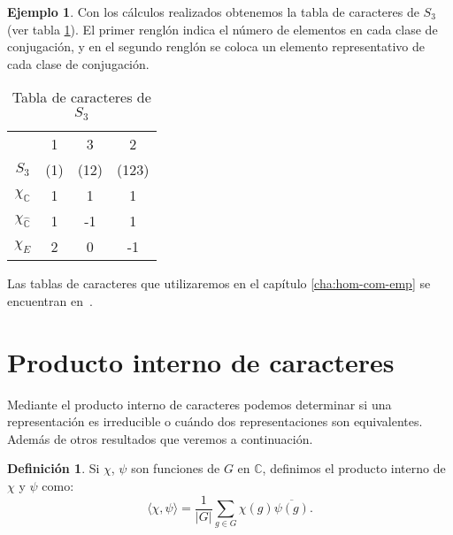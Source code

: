 \documentclass[12pt]{book}
\theoremstyle{definition}
\newtheorem{definition}[theorem]{Definición}
\newtheorem{example}[theorem]{Ejemplo}
\newcounter{in}
\newcounter{ini}
\begin{document}
\begin{example}
Con los cálculos realizados obtenemos la tabla de caracteres de
$S_{3}$ (ver tabla \ref{tabla-car-S3}). El primer renglón indica el
número de elementos en cada clase de conjugación, y en el segundo
renglón se coloca un elemento representativo de cada clase de
conjugación.
\begin{table}[htpb]
  \centering
  \begin{tabular}{ c| c c c}
      & 1 & 3 & 2 \\
      $S_{3}$ & (1) & (12) & (123) \\
      \hline
      $\chi_{\mathbb{C}}$ & 1 & 1 & 1 \\
      $\chi_{\mathbb{\hat C}}$ & 1 & -1 & 1 \\
      $\chi_{E}$ & 2 & 0 & -1 
    \end{tabular}
    
  \caption{Tabla de caracteres de $S_{3}$}
  \label{tabla-car-S3}
\end{table}

Las tablas de caracteres que utilizaremos en el capítulo
\ref{cha:hom-com-emp} se encuentran en~\cite{liebeck}.
\end{example}

\section{Producto interno de caracteres}
\label{producto-interno}

Mediante el producto interno de caracteres  podemos determinar si una
representación es irreducible o cuándo dos representaciones son
equivalentes. Además de otros resultados que veremos a continuación.
\begin{definition}
  Si $\chi$, $\psi$ son funciones de $G$ en $\mathbb{C}$, definimos el
  producto interno de $\chi$ y $\psi$ como:
  \begin{equation*}
    \langle\chi,\psi\rangle=\frac{1}{|G|}\sum_{g\in G}\chi(g)\overline{\psi(g)}.
  \end{equation*}
\end{definition}
\end{document}
